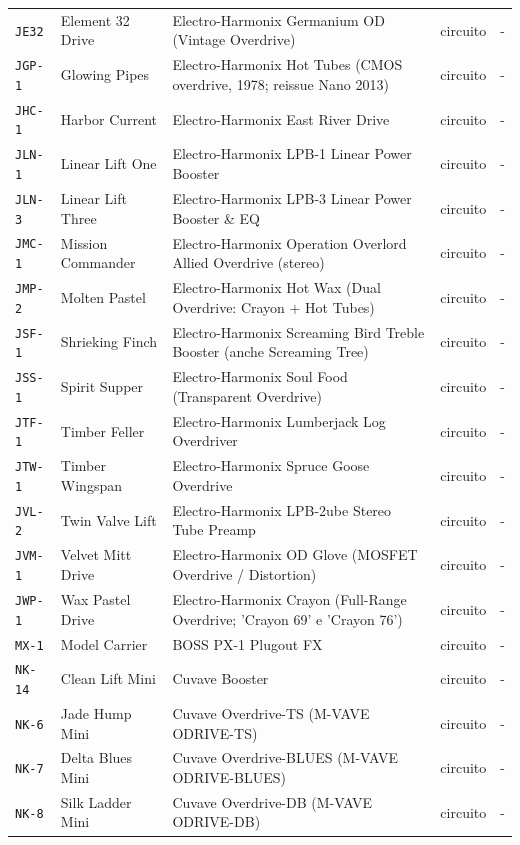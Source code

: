 \begin{xltabular}{\linewidth}{@{}l l X l l@{}}
\texttt{JE32} & Element 32 Drive & Electro-Harmonix Germanium OD (Vintage Overdrive) & circuito & -\\
\texttt{JGP-1} & Glowing Pipes & Electro-Harmonix Hot Tubes (CMOS overdrive, 1978; reissue Nano 2013) & circuito & -\\
\texttt{JHC-1} & Harbor Current & Electro-Harmonix East River Drive & circuito & -\\
\texttt{JLN-1} & Linear Lift One & Electro-Harmonix LPB-1 Linear Power Booster & circuito & -\\
\texttt{JLN-3} & Linear Lift Three & Electro-Harmonix LPB-3 Linear Power Booster \& EQ & circuito & -\\
\texttt{JMC-1} & Mission Commander & Electro-Harmonix Operation Overlord Allied Overdrive (stereo) & circuito & -\\
\texttt{JMP-2} & Molten Pastel & Electro-Harmonix Hot Wax (Dual Overdrive: Crayon + Hot Tubes) & circuito & -\\
\texttt{JSF-1} & Shrieking Finch & Electro-Harmonix Screaming Bird Treble Booster (anche Screaming Tree) & circuito & -\\
\texttt{JSS-1} & Spirit Supper & Electro-Harmonix Soul Food (Transparent Overdrive) & circuito & -\\
\texttt{JTF-1} & Timber Feller & Electro-Harmonix Lumberjack Log Overdriver & circuito & -\\
\texttt{JTW-1} & Timber Wingspan & Electro-Harmonix Spruce Goose Overdrive & circuito & -\\
\texttt{JVL-2} & Twin Valve Lift & Electro-Harmonix LPB-2ube Stereo Tube Preamp & circuito & -\\
\texttt{JVM-1} & Velvet Mitt Drive & Electro-Harmonix OD Glove (MOSFET Overdrive / Distortion) & circuito & -\\
\texttt{JWP-1} & Wax Pastel Drive & Electro-Harmonix Crayon (Full-Range Overdrive; 'Crayon 69' e 'Crayon 76') & circuito & -\\
\texttt{MX-1} & Model Carrier & BOSS PX-1 Plugout FX & circuito & -\\
\texttt{NK-14} & Clean Lift Mini & Cuvave Booster & circuito & -\\
\texttt{NK-6} & Jade Hump Mini & Cuvave Overdrive-TS (M-VAVE ODRIVE-TS) & circuito & -\\
\texttt{NK-7} & Delta Blues Mini & Cuvave Overdrive-BLUES (M-VAVE ODRIVE-BLUES) & circuito & -\\
\texttt{NK-8} & Silk Ladder Mini & Cuvave Overdrive-DB (M-VAVE ODRIVE-DB) & circuito & -\\

\end{xltabular}

